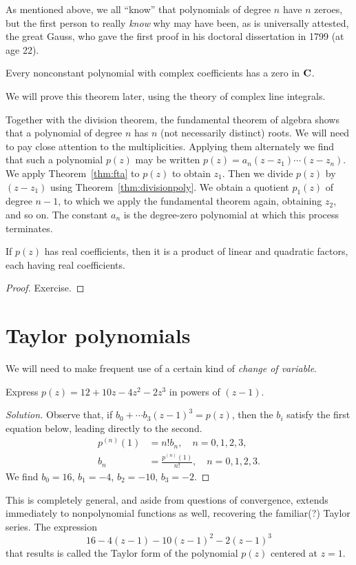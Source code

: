 \documentclass[twocolumn,12pt]{article}
\begin{document}
As mentioned above, we all ``know'' that polynomials of degree $n$ have $n$ zeroes, but the first person to really \emph{know} why may have been, as is universally attested, the great Gauss, who gave the first proof in his doctoral dissertation in 1799 (at age 22).
\begin{Theorem} \label{thm:fta}
  Every nonconstant polynomial with complex coefficients has a zero in $\mathbf{C}$.
\end{Theorem}
We will prove this theorem later, using the theory of complex line integrals.

Together with the division theorem, the fundamental theorem of algebra shows that a polynomial of degree $n$ has $n$ (not necessarily distinct) roots. We will need to pay close attention to the multiplicities. Applying them alternately we find that such a polynomial $p(z)$ may be written
$p(z) = a_n (z - z_1) \cdots (z - z_n)$. We apply Theorem~\ref{thm:fta} to $p(z)$ to obtain $z_1$. Then we divide $p(z)$ by $(z - z_1)$ using Theorem~\ref{thm:divisionpoly}. We obtain a quotient $p_1(z)$ of degree $n-1$, to which we apply the fundamental theorem again, obtaining $z_2$, and so on. The constant $a_n$ is the degree-zero polynomial at which this process terminates.
\begin{Theorem}
  If $p(z)$ has real coefficients, then it is a product of linear and quadratic factors, each having real coefficients.
\end{Theorem}
\begin{proof}
  Exercise.
\end{proof}
\section{Taylor polynomials}
We will need to make frequent use of a certain kind of \emph{change of variable}. 
\begin{example}
  Express $p(z) = 12+10z-4z^2-2z^3$ in powers of $(z-1)$.
\end{example}
\begin{proof}[Solution]
  Observe that, if $b_0 + \cdots b_3(z-1)^3 = p(z)$, then the $b_i$ satisfy the first equation below, leading directly to the second.
\begin{align*}
    p^{(n)}(1) &= n!b_n, \quad n = 0, 1, 2, 3, \\
    b_n &= \frac{p^{(n)}(1)}{n!}, \quad n = 0, 1, 2, 3.
\end{align*}
We find $b_0 = 16$, $b_1 = -4$, $b_2 = -10$, $b_3 = -2$.
\end{proof}
This is completely general, and aside from questions of convergence, extends immediately to nonpolynomial functions as well, recovering the familiar(?) Taylor series. The expression 
\[
  16 - 4(z - 1) - 10(z-1)^2 - 2(z-1)^3
\]
that results is called the Taylor form of the polynomial $p(z)$ centered at $z = 1$. 
\end{document}
